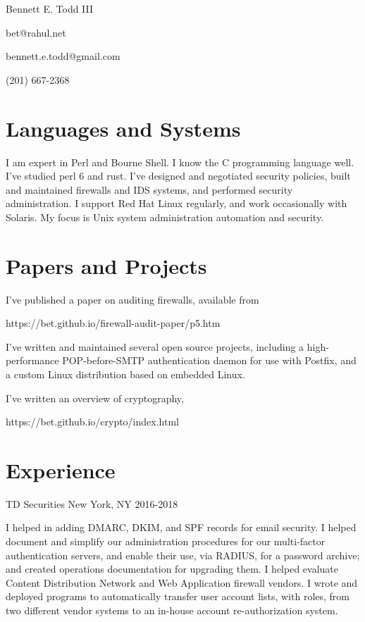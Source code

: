 \documentclass[12pt,letterpaper]{article}
\begin{document}
\frenchspacing

\begin{center}
Bennett E. Todd III

bet@rahul.net

bennett.e.todd@gmail.com

(201) 667-2368
\end{center}

\section*{Languages and Systems}

I am expert in Perl and Bourne Shell. I know the C programming
language well. I've studied perl 6 and rust. I've designed and
negotiated security policies, built and maintained firewalls and IDS
systems, and performed security administration. I support Red Hat
Linux regularly, and work occasionally with Solaris. My focus is
Unix system administration automation and security.

\section*{Papers and Projects}

I've published a paper on auditing firewalls, available from

https://bet.github.io/firewall-audit-paper/p5.htm

I've written and maintained several open source projects, including
a high-performance POP-before-SMTP authentication daemon for use
with Postfix, and a custom Linux distribution based on embedded
Linux.

I've written an overview of cryptography,

https://bet.github.io/crypto/index.html

\section*{Experience}

TD Securities \hfill New York, NY
2016-2018

I helped in adding DMARC, DKIM, and SPF records for email security.
I helped document and simplify our administration procedures for
our multi-factor authentication servers, and enable their use, via
RADIUS, for a password archive; and created operations documentation
for upgrading them. I helped evaluate Content Distribution Network
and Web Application firewall vendors. I wrote and deployed programs
to automatically transfer user account lists, with roles, from two
different vendor systems to an in-house account re-authorization
system.
\\~
\end{document}
